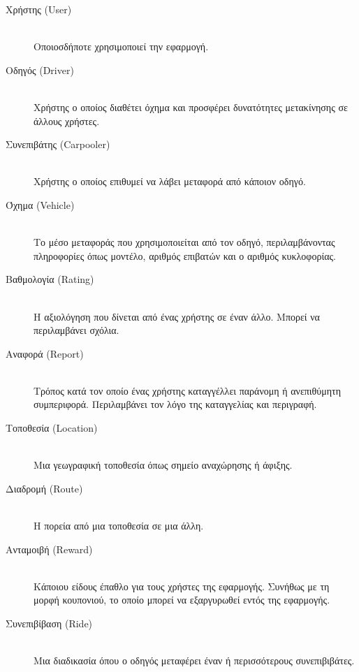 \begin{description}
    \item[Χρήστης (User)] \hfill \\
        Οποιοσδήποτε χρησιμοποιεί την εφαρμογή.

    \item[Οδηγός (Driver)] \hfill \\
        Χρήστης ο οποίος διαθέτει όχημα και προσφέρει δυνατότητες μετακίνησης σε άλλους χρήστες.

    \item[Συνεπιβάτης (Carpooler)] \hfill \\
        Χρήστης ο οποίος επιθυμεί να λάβει μεταφορά από κάποιον οδηγό.

    \item[Όχημα (Vehicle)] \hfill \\
        Το μέσο μεταφοράς που χρησιμοποιείται από τον οδηγό, περιλαμβάνοντας πληροφορίες όπως
        μοντέλο, αριθμός επιβατών και ο αριθμός κυκλοφορίας.

    \item[Βαθμολογία (Rating)] \hfill \\
        Η αξιολόγηση που δίνεται από ένας χρήστης σε έναν άλλο. Μπορεί να περιλαμβάνει
        σχόλια.

    \item[Αναφορά (Report)] \hfill \\
        Τρόπος κατά τον οποίο ένας χρήστης καταγγέλλει παράνομη ή ανεπιθύμητη συμπεριφορά.
        Περιλαμβάνει τον λόγο της καταγγελίας και περιγραφή.

    \item[Τοποθεσία (Location)] \hfill \\
        Μια γεωγραφική τοποθεσία όπως σημείο αναχώρησης ή άφιξης.

    \item[Διαδρομή (Route)] \hfill \\
        Η πορεία από μια τοποθεσία σε μια άλλη.

    \item[Ανταμοιβή (Reward)] \hfill \\
        Κάποιου είδους έπαθλο για τους χρήστες της εφαρμογής. Συνήθως με τη μορφή κουπονιού,
        το οποίο μπορεί να εξαργυρωθεί εντός της εφαρμογής.

    \item[Συνεπιβίβαση (Ride)] \hfill \\
        Μια διαδικασία όπου ο οδηγός μεταφέρει έναν ή περισσότερους συνεπιβιβάτες.


\end{description}
